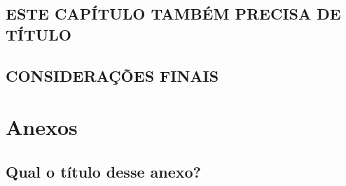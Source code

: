 \documentclass[pdftex,12pt,oneside,a4paper,english,french,spanish,brazil]{abntex2}
\begin{document}
\begin{sloppypar}
            \chapter{ESTE CAPÍTULO TAMBÉM PRECISA DE TÍTULO}\label{cap:capitulo2}
            
          
            \chapter{CONSIDERAÇÕES FINAIS}\label{cap:consideracoesfinais}
            
          
            

          \postextual          
        
            \cleardoublepage
            \renewcommand{\bibname}{REFERÊNCIAS}
            
        



                
            \part*{Anexos}
            \begin{anexosenv}

                \chapter{Qual o título desse anexo?}\label{anex:anex01}
                

            \end{anexosenv}
          

    \end{sloppypar}
\end{document}

